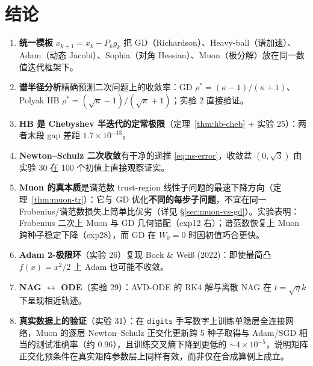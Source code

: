 \section{结论}
\label{sec:conclusion}

\begin{enumerate}[nosep]
  \item \textbf{统一模板} $x_{k+1} = x_k - P_k g_k$ 把 GD（Richardson）、Heavy-ball（谱加速）、Adam（动态 Jacobi）、Sophia（对角 Hessian）、Muon（极分解）放在同一数值迭代框架下。
  \item \textbf{谱半径分析}精确预测二次问题上的收敛率：GD $\rho^* = (\kappa-1)/(\kappa+1)$、Polyak HB $\rho^* = (\sqrt\kappa-1)/(\sqrt\kappa+1)$；实验 2 直接验证。
  \item \textbf{HB 是 Chebyshev 半迭代的定常极限}（定理~\ref{thm:hb-cheb} + 实验 25）：两者末段 gap 差距 $1.7 \times 10^{-13}$。
  \item \textbf{Newton--Schulz 二次收敛}有干净的递推 \eqref{eq:ns-error}，收敛盆 $(0, \sqrt 3)$ 由实验 30 在 100 个初值上直接观察证实。
  \item \textbf{Muon 的真本质}是谱范数 trust-region 线性子问题的最速下降方向（定理~\ref{thm:muon-tr}）：它与 GD 优化\textbf{不同的每步子问题}，不宜在同一 Frobenius/谱范数损失上简单比优劣（详见 \S\ref{sec:muon-vs-gd}）。实验表明：Frobenius 二次上 Muon 与 GD 几何错配（exp12 右）；谱范数恢复上 Muon 跨种子稳定下降（exp28），而 GD 在 $W_0=0$ 时因初值巧合更快。
  \item \textbf{Adam 2-极限环}（实验 26）复现 Bock \& Wei{\ss} (2022)：即使最简凸 $f(x) = x^2/2$ 上 Adam 也可能不收敛。
  \item \textbf{NAG $\leftrightarrow$ ODE}（实验 29）：AVD-ODE 的 RK4 解与离散 NAG 在 $t = \sqrt\eta k$ 下呈现相近轨迹。
  \item \textbf{真实数据上的验证}（实验 31）：在 \texttt{digits} 手写数字上训练单隐层全连接网络，Muon 的逐层 Newton--Schulz 正交化更新跨 5 种子取得与 Adam/SGD 相当的测试准确率（约 $0.96$），且训练交叉熵下降到更低的 $\sim 4\times 10^{-5}$，说明矩阵正交化预条件在真实矩阵参数层上同样有效，而非仅在合成算例上成立。
\end{enumerate}
